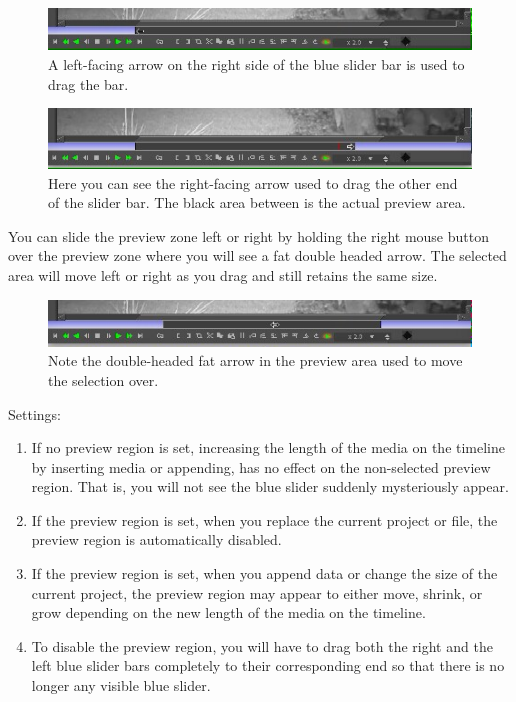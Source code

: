 \begin{figure}[htpb]
    \centering
    \includegraphics[width=0.8\linewidth]{images/timebar2.png}
    \caption{ A left-facing arrow on the right side of the blue slider bar is used to drag the bar.}
    \label{fig:timebar2}
\end{figure}

\begin{figure}[htpb]
    \centering
    \includegraphics[width=0.8\linewidth]{images/timebar3.png}
    \caption{Here you can see the right-facing arrow used to drag the other end of the slider bar.  
        The black area between is the actual preview area.}
    \label{fig:timebar3}
\end{figure}

You can slide the preview zone left or right by holding the right mouse button over the preview zone where you will see a fat double headed arrow.  
The selected area will move left or right as you drag and still retains the same size.

\begin{figure}[htpb]
    \centering
    \includegraphics[width=0.8\linewidth]{images/timebar4.png}
    \caption{Note the double-headed fat arrow in the preview area used  to move the selection over.}
    \label{fig:timebar4}
\end{figure}

Settings:

\begin{enumerate}
    \item  If no preview region is set, increasing the length of the media on the timeline by inserting media or
        appending, has no effect on the non-selected preview region.  That is, you will not see the blue slider
        suddenly mysteriously appear.
    \item  If the preview region is set, when you replace the current project or file,  the preview region is
        automatically disabled.
    \item  If the preview region is set, when you append data or change the size of the current project, the
        preview region may appear to either move, shrink, or grow depending on the new length of the
        media on the timeline.  
    \item  To disable the preview region, you will have to drag both the right and the left blue slider bars
        completely to their corresponding end so that there is no longer any visible blue slider.
\end{enumerate}


